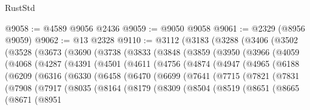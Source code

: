 \begin{lexlean}{RustStd}
\begin{coremodule}
@9058 := @4589 @9056 @2436
@9059 := @9050 @9058
@9061 := @2329 (@8956 @9059)
@9062 := @13 @2328
@9110 := @3112
    (@3183
      (@3288
        (@3406
          (@3502
            (@3528
              (@3673
                (@3690
                  (@3738
                    (@3833
                      (@3848
                        (@3859
                          (@3950
                            (@3966
                              (@4059
                                (@4068
                                  (@4287
                                    (@4391
                                      (@4501
                                        (@4611
                                          (@4756
                                            (@4874
                                              (@4947
                                                (@4965
                                                  (@6188
                                                    (@6209
                                                      (@6316
                                                        (@6330
                                                          (@6458
                                                            (@6470
                                                              (@6699
                                                                (@7641
                                                                  (@7715
                                                                    (@7821
                                                                      (@7831
                                                                        (@7908
                                                                          (@7917
                                                                            (@8035
                                                                              (@8164
                                                                                (@8179
                                                                                  (@8309
                                                                                    (@8504
                                                                                      (@8519
                                                                                        (@8651
                                                                                          (@8665
                                                                                            (@8671
                                                                                              (@8951

\end{coremodule}
\end{lexlean}
